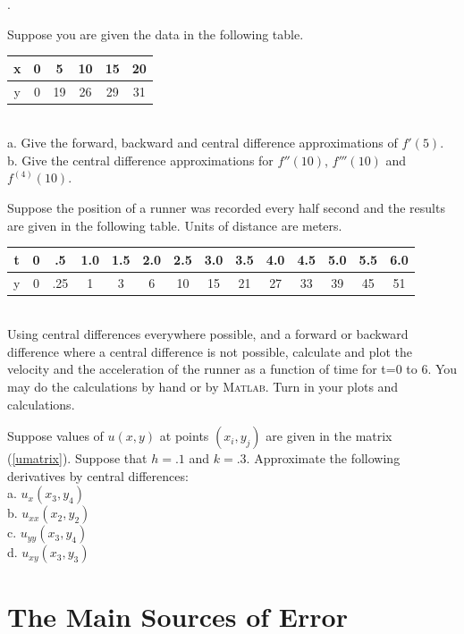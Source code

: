 \begin{list}
{.}{}

\item Suppose you are given the data in the following table.\\
\begin{tabular}{c|ccccc}
x & 0 & 5 & 10 & 15 & 20 \\ \hline
y & 0 & 19 & 26 & 29 & 31
\end{tabular}\\
a. Give the forward, backward and central difference approximations of $f'(5)$.\\
b. Give the central difference approximations for $f''(10)$, $f'''(10)$ and
   $f^{(4)}(10)$.
   
\item Suppose the position of a runner was recorded every half second and the results
are given in the following table. Units of distance are meters.\\
\begin{tabular}{c|ccccccccccccc}
t & 0 & .5   & 1.0 & 1.5 & 2.0 & 2.5 & 3.0 & 3.5 & 4.0 & 4.5 & 5.0 & 5.5 & 6.0 \\ \hline
y & 0 & .25 & 1   &   3  & 6    & 10  & 15  & 21  & 27  & 33  &  39  & 45  & 51
 \end{tabular}\\
 Using central differences everywhere possible, and a forward or backward difference where
a central difference is not possible, calculate and plot the velocity and the acceleration of the runner
as a function of time for t=0 to 6. You may do the calculations by hand or by \textsc{Matlab}.  
Turn in your plots and calculations.

\item Suppose values of $u(x,y)$ at points $(x_i,y_j)$ are given in the
matrix (\ref{umatrix}). Suppose that $h = .1$ and $k = .3$.
Approximate the following derivatives by central differences:\\
a. $u_x(x_3,y_4)$\\
b. $u_{xx}(x_2,y_2)$\\
c. $u_{yy}(x_3,y_4)$\\
d. $u_{xy}(x_3,y_3)$


\end{list}





\chapter{The Main Sources of Error}

